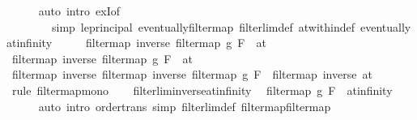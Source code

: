 \begin{isabellebody}
\ \ \ \ \isamarkupfalse%
\ {\isacharparenleft}{\kern0pt}auto\ intro{\isacharbang}{\kern0pt}{\isacharcolon}{\kern0pt}\ exI{\isacharbrackleft}{\kern0pt}of\ {\isacharunderscore}{\kern0pt}\ {}{\isacharbrackright}{\kern0pt}\isanewline
\ \ \ \ \ \ \ \ simp{\isacharcolon}{\kern0pt}\ le{\isacharunderscore}{\kern0pt}principal\ eventually{\isacharunderscore}{\kern0pt}filtermap\ filterlim{\isacharunderscore}{\kern0pt}def\ at{\isacharunderscore}{\kern0pt}within{\isacharunderscore}{\kern0pt}def\ eventually{\isacharunderscore}{\kern0pt}at{\isacharunderscore}{\kern0pt}infinity{\isacharparenright}{\kern0pt}\isanewline
\ \ \isamarkupfalse%
\ \isamarkupfalse%
\ {\isachardoublequoteopen}filtermap\ inverse\ {\isacharparenleft}{\kern0pt}filtermap\ g\ F{\isacharparenright}{\kern0pt}\ {\isasymle}\ at\ {}{\isachardoublequoteclose}\ \isacommand{{\isachardot}{\kern0pt}}\isamarkupfalse%
\isanewline
{}\isamarkupfalse%
\isanewline
\ \ \isamarkupfalse%
\ {\isachardoublequoteopen}filtermap\ inverse\ {\isacharparenleft}{\kern0pt}filtermap\ g\ F{\isacharparenright}{\kern0pt}\ {\isasymle}\ at\ {}{\isachardoublequoteclose}\isanewline
\ \ \isamarkupfalse%
\ \isamarkupfalse%
\ {\isachardoublequoteopen}filtermap\ inverse\ {\isacharparenleft}{\kern0pt}filtermap\ inverse\ {\isacharparenleft}{\kern0pt}filtermap\ g\ F{\isacharparenright}{\kern0pt}{\isacharparenright}{\kern0pt}\ {\isasymle}\ filtermap\ inverse\ {\isacharparenleft}{\kern0pt}at\ {}{\isacharparenright}{\kern0pt}{\isachardoublequoteclose}\isanewline
\ \ \ \ \isamarkupfalse%
\ {\isacharparenleft}{\kern0pt}rule\ filtermap{\isacharunderscore}{\kern0pt}mono{\isacharparenright}{\kern0pt}\isanewline
\ \ \isamarkupfalse%
\ filterlim{\isacharunderscore}{\kern0pt}inverse{\isacharunderscore}{\kern0pt}at{\isacharunderscore}{\kern0pt}infinity\ \isamarkupfalse%
\ {\isachardoublequoteopen}filtermap\ g\ F\ {\isasymle}\ at{\isacharunderscore}{\kern0pt}infinity{\isachardoublequoteclose}\isanewline
\ \ \ \ \isamarkupfalse%
\ {\isacharparenleft}{\kern0pt}auto\ intro{\isacharcolon}{\kern0pt}\ order{\isacharunderscore}{\kern0pt}trans\ simp{\isacharcolon}{\kern0pt}\ filterlim{\isacharunderscore}{\kern0pt}def\ filtermap{\isacharunderscore}{\kern0pt}filtermap{\isacharparenright}{\kern0pt}\isanewline
{}\isamarkupfalse%
%
\endisatagproof
{\isafoldproof}%
%
\isadelimproof
\isanewline
%
\endisadelimproof
\isanewline
{}\isamarkupfalse%

\end{isabellebody}
